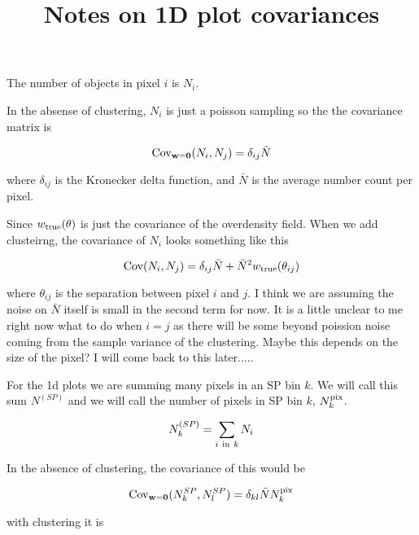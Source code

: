 \documentclass[12pt]{article}
\begin{document}
 
\title{Notes on 1D plot covariances}
\maketitle

The number of objects in pixel $i$ is $N_i$.

In the absense of clustering, $N_i$ is just a poisson sampling so the the covariance matrix is


\begin{equation}
{\bf {\rm Cov}_{w=0}}(N_i,N_j) = \delta_{ij}{\bar N}
\end{equation}

where $\delta_{ij}$ is the Kronecker delta function, and ${\bar N}$ is the average number count per pixel. 

Since $w_{\rm true}(\theta)$ is just the covariance of the overdensity field. When we add clusteirng, the covariance of $N_i$ looks something like this

\begin{equation}
{\bf {\rm Cov}}(N_i,N_j) = \delta_{ij}{\bar N} + {\bar N}^2 w_{\rm true}(\theta_{ij})
\end{equation}

where $\theta_{ij}$ is the separation between pixel $i$ and $j$. I think we are assuming the noise on ${\bar N}$ itself is small in the second term for now. It is a little unclear to me right now what to do when $i=j$ as there will be some beyond poission noise coming from the sample variance of the clustering. Maybe this depends on the size of the pixel? I will come back to this later.....

For the 1d plots we are summing many pixels in an SP bin $k$. We will call this sum $N^{(SP)}$ and we will call the number of pixels in SP bin $k$, $N^{\rm pix}_{k}$.

\begin{equation}
N^{(SP)}_{k} = \sum_{i { \ \rm in \ } k} N_{i}
\end{equation}

In the absence of clustering, the covariance of this would be 

\begin{equation}
{\bf {\rm Cov}_{w=0}}(N^{SP}_k, N^{SP}_l) = \delta_{kl} {\bar N} N^{\rm pix}_{k}
\end{equation}

with clustering it is
\end{document}
